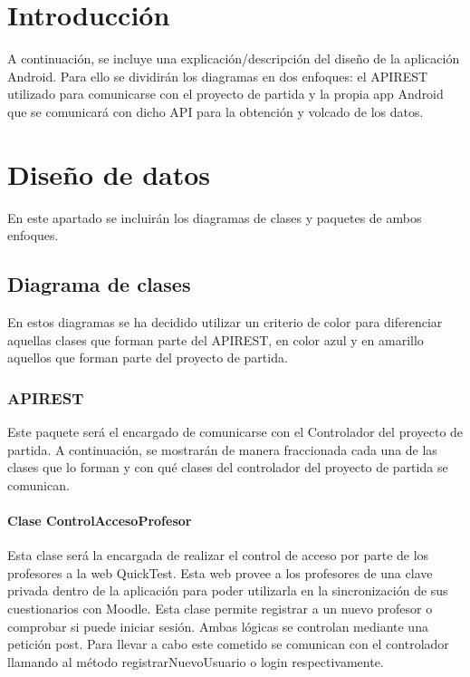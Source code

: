 
\section{Introducción}

A continuación, se incluye una explicación/descripción del diseño de la aplicación Android. Para ello se dividirán los diagramas en dos enfoques: el APIREST utilizado para comunicarse con el proyecto de partida y la propia app Android que se comunicará con dicho API para la obtención y volcado de los datos.

\section{Diseño de datos}

En este apartado se incluirán los diagramas de clases y paquetes de ambos enfoques.

\subsection{Diagrama de clases}

En estos diagramas se ha decidido utilizar un criterio de color para diferenciar aquellas clases que forman parte del APIREST, en color azul y en amarillo aquellos que forman parte del proyecto de partida.

\subsubsection{APIREST}

Este paquete será el encargado de comunicarse con el Controlador del proyecto de partida. A continuación, se mostrarán de manera fraccionada cada una de las clases que lo forman y con qué clases del controlador del proyecto de partida se comunican.

\paragraph{Clase ControlAccesoProfesor}

Esta clase será la encargada de realizar el control de acceso por parte de los profesores a la web QuickTest. Esta web provee a los profesores de una clave privada dentro de la aplicación para poder utilizarla en la sincronización de sus cuestionarios con Moodle. Esta clase permite registrar a un nuevo profesor o comprobar si puede iniciar sesión. Ambas lógicas se controlan mediante una petición post. Para llevar a cabo este cometido se comunican con el controlador llamando al método registrarNuevoUsuario o login respectivamente.

